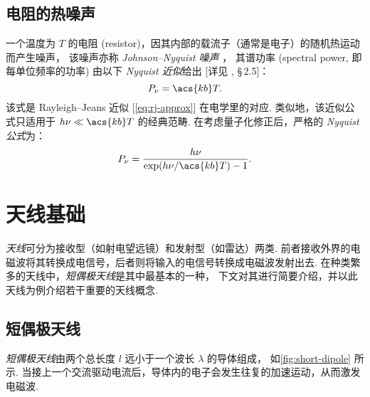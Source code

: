 \subsection{电阻的热噪声}

一个温度为 $T$ 的电阻 (resistor)，因其内部的载流子（通常是电子）的随机热运动而产生噪声，
该噪声亦称 \emph{Johnson--Nyquist 噪声} \cite{johnson1928,nyquist1928}，
其谱功率 (spectral power, 即每单位频率的功率) 由以下 \emph{Nyquist 近似}给出
[详见 , \S\,2.5]：
\begin{equation}
  \label{eq:nyquist-approx}
  P_{\nu} = \acs{kb} T .
\end{equation}
该式是 Rayleigh--Jeans 近似 [\autoref{eq:rj-approx}] 在电学里的对应.
类似地，该近似公式只适用于 $h\nu \ll \acs{kb}T$ 的经典范畴.
在考虑量子化修正后，严格的 \emph{Nyquist 公式}为：
\begin{equation}
  \label{eq:nyquist}
  P_{\nu} = \frac{h\nu}{\exp(h \nu / \acs{kb} T) - 1} .
\end{equation}


\section{天线基础}
\label{sec:antenna}

\emph{天线}可分为接收型（如射电望远镜）和发射型（如雷达）两类.
前者接收外界的电磁波将其转换成电信号，后者则将输入的电信号转换成电磁波发射出去.
在种类繁多的天线中，\emph{短偶极天线}是其中最基本的一种，
下文对其进行简要介绍，并以此天线为例介绍若干重要的天线概念.

\subsection{短偶极天线}

\emph{短偶极天线}由两个总长度 $l$ 远小于一个波长 $\lambda$ 的导体组成，
如\autoref{fig:short-dipole} 所示.
当接上一个交流驱动电流后，导体内的电子会发生往复的加速运动，从而激发电磁波.

